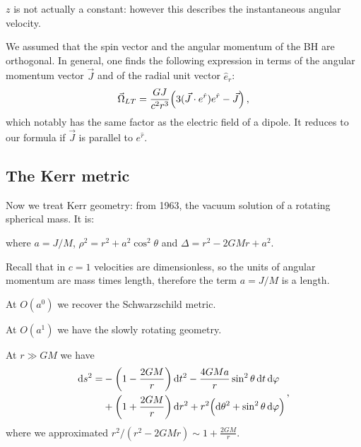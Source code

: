 \documentclass[main.tex]{subfiles}
\begin{document}
\(z\) is not actually a constant: however this describes the instantaneous angular velocity. 

We assumed that the spin vector and the angular momentum of the BH are orthogonal. In general, one finds the following expression in terms of the angular momentum vector \(\vec{J}\) and of the radial unit vector \(\hat{e}_{r}\):
%
\begin{align}
  \vec{\Omega}_{LT} = \frac{GJ}{c^2r^3} \qty(3 (\vec{J} \cdot e^{\hat{r}}) e^{\hat{r}} - \vec{J})
\,,
\end{align}
%
which notably has the same factor as the electric field of a dipole. It reduces to our formula if \(\vec{J}\) is parallel to \(e^{\hat{r}}\). 

\subsection{The Kerr metric}

Now we treat Kerr geometry: from 1963, the vacuum solution of a rotating spherical mass. It is: 
%

%

%
where \(a = J/M\), \(\rho^2= r^2+a^2 \cos^2\theta  \) and \(\Delta = r^2 - 2GMr +a^2\). 

Recall that in \(c=1\) velocities are dimensionless, so the units of angular momentum are mass times length, therefore the term \(a = J/M\) is a length. 

At \(O(a^{0})\) we recover the Schwarzschild metric. 

At \(O(a^{1})\) we have the slowly rotating geometry. 

At \(r \gg GM\) we have 
%
\begin{subequations}
\begin{align}
  \begin{split}    
  \dd{s^2} = &- \qty(1 - \frac{2GM}{r}) \dd{t^2}
  - \frac{4GMa}{r} \sin^2 \theta \dd{t} \dd{\varphi } \\
  &+ \qty(1 + \frac{2GM}{r}) \dd{r^2} 
  + r^2 \qty(\dd{\theta^2} + \sin^2 \theta \dd{\varphi })
  \end{split}
\,,
\end{align}
\end{subequations}
%
where we approximated \(r^2/(r^2-2GMr) \sim 1 + \frac{2GM}{r}\). 
\end{document}
